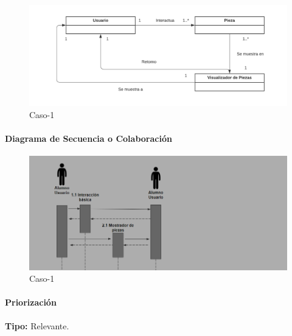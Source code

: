 \begin{figure}[H]
\centerline{\includegraphics[width=15cm]{imgs/ModeloConceptualCaso_3_3.png}}
\caption{Caso-1}
\label{fig}
\end{figure}


\paragraph{Diagrama de Secuencia o Colaboración}

\begin{figure}[H]
\centerline{\includegraphics[width=15cm]{imgs/CasoUso_3_2.PNG}}
\caption{Caso-1}
\label{fig}
\end{figure}

\paragraph{Priorización}
{\textbf {Tipo:}}
Relevante.